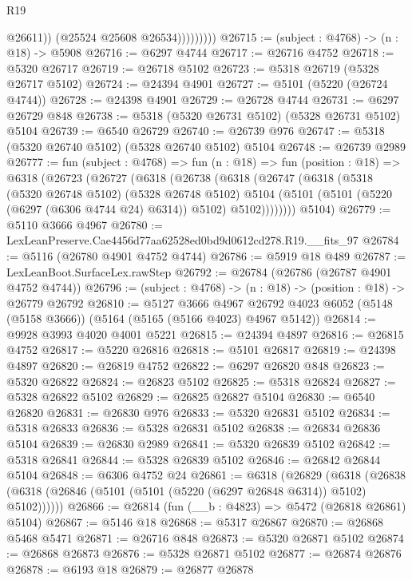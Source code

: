 \begin{lexlean}{R19}
\begin{coremodule}
{{{{{{{{{{{                        @26611))
                    (@25524 @25608 @26534)))))))))
@26715 := (subject : @4768) -> (n : @18) -> @5908
@26716 := @6297 @4744
@26717 := @26716 @4752
@26718 := @5320 @26717
@26719 := @26718 @5102
@26723 := @5318 @26719 (@5328 @26717 @5102)
@26724 := @24394 @4901
@26727 := @5101 (@5220 (@26724 @4744))
@26728 := @24398 @4901
@26729 := @26728 @4744
@26731 := @6297 @26729 @848
@26738 := @5318 (@5320 @26731 @5102) (@5328 @26731 @5102) @5104
@26739 := @6540 @26729
@26740 := @26739 @976
@26747 := @5318 (@5320 @26740 @5102) (@5328 @26740 @5102) @5104
@26748 := @26739 @2989
@26777 := fun (subject : @4768) =>
  fun (n : @18) =>
  fun (position : @18) =>
  @6318
    (@26723
      (@26727
        (@6318
          (@26738
            (@6318
              (@26747
                (@6318
                  (@5318
                    (@5320 @26748 @5102)
                    (@5328 @26748 @5102)
                    @5104
                    (@5101 (@5101 (@5220 (@6297 (@6306 @4744 @24) @6314)) @5102) @5102))))))))
      @5104)
@26779 := @5110 @3666 @4967
@26780 := LexLeanPreserve.Cae4456d77aa62528ed0bd9d0612cd278.R19.__fits_97
@26784 := @5116 (@26780 @4901 @4752 @4744)
@26786 := @5919 @18 @489
@26787 := LexLeanBoot.SurfaceLex.rawStep
@26792 := @26784 (@26786 (@26787 @4901 @4752 @4744))
@26796 := (subject : @4768) -> (n : @18) -> (position : @18) -> @26779 @26792
@26810 := @5127
    @3666
    @4967
    @26792
    @4023
    @6052
    (@5148 (@5158 @3666))
    (@5164 (@5165 (@5166 @4023) @4967 @5142))
@26814 := @9928 @3993 @4020 @4001 @5221
@26815 := @24394 @4897
@26816 := @26815 @4752
@26817 := @5220 @26816
@26818 := @5101 @26817
@26819 := @24398 @4897
@26820 := @26819 @4752
@26822 := @6297 @26820 @848
@26823 := @5320 @26822
@26824 := @26823 @5102
@26825 := @5318 @26824
@26827 := @5328 @26822 @5102
@26829 := @26825 @26827 @5104
@26830 := @6540 @26820
@26831 := @26830 @976
@26833 := @5320 @26831 @5102
@26834 := @5318 @26833
@26836 := @5328 @26831 @5102
@26838 := @26834 @26836 @5104
@26839 := @26830 @2989
@26841 := @5320 @26839 @5102
@26842 := @5318 @26841
@26844 := @5328 @26839 @5102
@26846 := @26842 @26844 @5104
@26848 := @6306 @4752 @24
@26861 := @6318
    (@26829
      (@6318 (@26838 (@6318 (@26846 (@5101 (@5101 (@5220 (@6297 @26848 @6314)) @5102) @5102))))))
@26866 := @26814 (fun (__b : @4823) => @5472 (@26818 @26861) @5104)
@26867 := @5146 @18
@26868 := @5317 @26867
@26870 := @26868 @5468 @5471
@26871 := @26716 @848
@26873 := @5320 @26871 @5102
@26874 := @26868 @26873
@26876 := @5328 @26871 @5102
@26877 := @26874 @26876
@26878 := @6193 @18
@26879 := @26877 @26878
}}}}}}}}}}}
\end{coremodule}
\end{lexlean}

